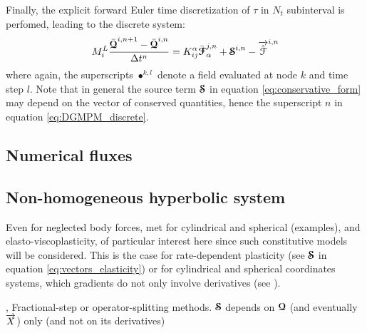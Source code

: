 

Finally, the explicit forward Euler time discretization of $\tau$ in $N_t$ subinterval is perfomed, leading to the discrete system:
\begin{equation}
  \label{eq:DGMPM_discrete}
  M^L_i \frac{\bar{{\boldsymbol{\mathcal{Q}}}}^{i,n+1} - \bar{{\boldsymbol{\mathcal{Q}}}}^{i,n}}{\Delta t^{n} } = K^\alpha_{ij} \bar{{\boldsymbol{\mathcal{F}}}}_{\alpha}^{j,n} + {\boldsymbol{\mathcal{S}}}^{i,n}- {\overrightarrow{\hat{\mathcal{F}}}}^{i,n}  
\end{equation}
where again, the superscripts $\bullet^{k,l}$ denote a field evaluated at node $k$ and time step $l$.
Note that in general the source term ${\boldsymbol{\mathcal{S}}}$ in equation \eqref{eq:conservative_form} may depend on the vector of conserved quantities, hence the superscript $n$ in equation \eqref{eq:DGMPM_discrete}. 

\subsection{Numerical fluxes}


\subsection{Non-homogeneous hyperbolic system}
Even for neglected body forces, met for cylindrical and spherical (examples), and elasto-viscoplasticity, of particular interest here since such constitutive models will be considered.
This is the case for rate-dependent plasticity (see ${\boldsymbol{\mathcal{S}}}$ in equation \eqref{eq:vectors_elasticity}) or for cylindrical and spherical coordinates systems, which gradients do not only involve derivatives (see \cite[Ch.~17]{Leveque}). 

\cite[p.548]{Toro}, \cite{Thomas_EVP}
Fractional-step or operator-splitting methods. ${\boldsymbol{\mathcal{S}}}$ depends on ${\boldsymbol{\mathcal{Q}}}$ (and eventually ${\overrightarrow{X}}$) only (and not on its derivatives) 

